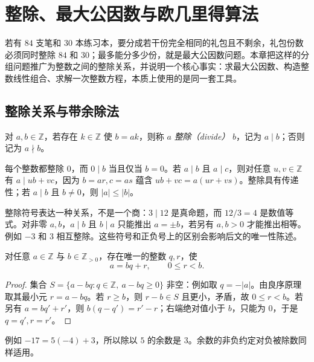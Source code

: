 \setcounter{chapter}{1} %
\chapter{整除、最大公因数与欧几里得算法}
\label{ch:divisibility}

若有 $84$ 支笔和 $30$ 本练习本，要分成若干份完全相同的礼包且不剩余，礼包份数必须同时整除 $84$ 和 $30$；最多能分多少份，就是最大公因数问题。本章把这样的分组问题推广为整数之间的整除关系，并说明一个核心事实：求最大公因数、构造整数线性组合、求解一次整数方程，本质上使用的是同一套工具。

\section{整除关系与带余除法}

\begin{definition}
对 $a,b\in\mathbb Z$，若存在 $k\in\mathbb Z$ 使 $b=ak$，则称 $a$ \emph{整除（divide）} $b$，记为 $a\mid b$；否则记为 $a\nmid b$。
\end{definition}

每个整数都整除 $0$，而 $0\mid b$ 当且仅当 $b=0$。若 $a\mid b$ 且 $a\mid c$，则对任意 $u,v\in\mathbb Z$ 有 $a\mid ub+vc$，因为 $b=ar,c=as$ 蕴含 $ub+vc=a(ur+vs)$。整除具有传递性；若 $a\mid b$ 且 $b\ne0$，则 $|a|\le|b|$。

整除符号表达一种关系，不是一个商：$3\mid12$ 是真命题，而 $12/3=4$ 是数值等式。对非零 $a,b$，$a\mid b$ 且 $b\mid a$ 只能推出 $a=\pm b$，若另有 $a,b>0$ 才能推出相等。例如 $-3$ 和 $3$ 相互整除。这些符号和正负号上的区别会影响后文的唯一性陈述。

\begin{theorem}
\label{thm:division}
对任意 $a\in\mathbb Z$ 与 $b\in\mathbb Z_{>0}$，存在唯一的整数 $q,r$，使
\begin{equation}
  a=bq+r,\qquad 0\le r<b.
  \label{eq:division-algorithm}
\end{equation}
\end{theorem}
\begin{proof}
集合 $S=\{a-bq:q\in\mathbb Z,\ a-bq\ge0\}$ 非空：例如取 $q=-|a|$。由良序原理取其最小元 $r=a-bq$。若 $r\ge b$，则 $r-b\in S$ 且更小，矛盾，故 $0\le r<b$。若另有 $a=bq'+r'$，则 $b(q-q')=r'-r$；右端绝对值小于 $b$，只能为 $0$，于是 $q=q',r=r'$。
\end{proof}

例如 $-17=5(-4)+3$，所以除以 $5$ 的余数是 $3$。余数的非负约定对负被除数同样适用。


